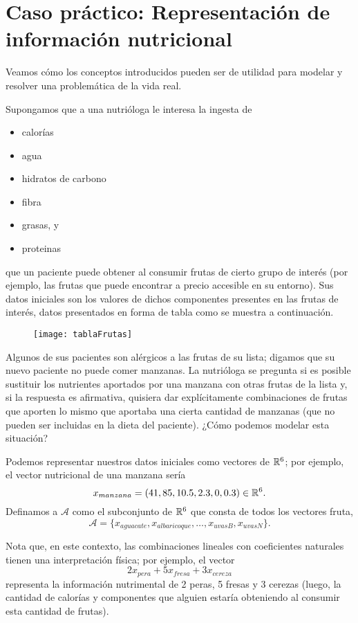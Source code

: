 \section{Caso práctico: Representación de información nutricional}

Veamos cómo los conceptos introducidos pueden ser de utilidad
para modelar y resolver una problemática de la vida real.

Supongamos que a una nutrióloga le interesa
la ingesta de 
\begin{itemize}
	\item calorías
	\item agua
	\item hidratos de carbono 
	\item fibra
	\item grasas, y 
	\item proteinas
\end{itemize}
que un paciente puede obtener al consumir frutas de cierto
grupo de interés (por ejemplo, las frutas que puede encontrar
a precio accesible en su entorno). Sus datos iniciales son
los valores de dichos componentes presentes en las frutas
de interés, datos presentados en forma de tabla como
se muestra a continuación.

\begin{figure}[H]
	\centering
	\texttt{[image: tablaFrutas]} 
\end{figure}	

Algunos de sus pacientes son alérgicos a las frutas de
su lista; digamos que su nuevo paciente no puede 
comer manzanas. La nutrióloga se pregunta si es posible
sustituir los nutrientes aportados por una manzana
con otras frutas de la lista y, si la respuesta es afirmativa,
quisiera dar explícitamente combinaciones de frutas que 
aporten lo mismo que aportaba una cierta cantidad de manzanas
(que no pueden ser incluidas en la dieta del paciente). 
¿Cómo podemos modelar esta situación?

Podemos representar nuestros datos iniciales como
vectores de $\mathbb{R}^{6}$; por ejemplo, el vector
nutricional de una manzana sería
\[
x_{manzana} = (41, 85, 10.5, 2.3, 0, 0.3)
\in \mathbb{R}^{6}.
\]
Definamos a $\mathcal{A}$ como el subconjunto de $\mathbb{R}^{6}$
que consta de todos los vectores fruta,
\[
\mathcal{A} = \{ x_{aguacate}, x_{albaricoque}, \ldots , x_{uvasB},
x_{uvasN} \}.
\]

Nota que, en este contexto, las combinaciones lineales
con coeficientes naturales tienen una interpretación física; por
ejemplo, el vector
\[
2x_{pera} + 5 x_{fresa} + 3 x_{cereza}
\]
representa la información nutrimental de 2 peras,
5 fresas y 3 cerezas (luego, la cantidad de calorías y componentes
que alguien estaría obteniendo al consumir esta cantidad de frutas).

